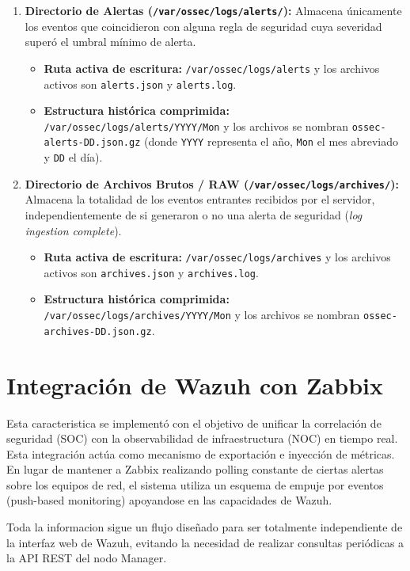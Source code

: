 \begin{enumerate}[leftmargin=*]
    \item \textbf{Directorio de Alertas (\texttt{/var/ossec/logs/alerts/}):}
    Almacena únicamente los eventos que coincidieron con alguna regla de seguridad cuya severidad superó el umbral mínimo de alerta.
    \begin{itemize}
        \item \textbf{Ruta activa de escritura:} \texttt{/var/ossec/logs/alerts} y los archivos activos son \texttt{alerts.json} y \texttt{alerts.log}.
        \item \textbf{Estructura histórica comprimida:} \texttt{/var/ossec/logs/alerts/YYYY/Mon} y los archivos se nombran \texttt{ossec-alerts-DD.json.gz} (donde \texttt{YYYY} representa el año, \texttt{Mon} el mes abreviado y \texttt{DD} el día).
    \end{itemize}

    \item \textbf{Directorio de Archivos Brutos / RAW (\texttt{/var/ossec/logs/archives/}):}
    Almacena la totalidad de los eventos entrantes recibidos por el servidor, independientemente de si generaron o no una alerta de seguridad (\textit{log ingestion complete}).
    \begin{itemize}
        \item \textbf{Ruta activa de escritura:} \texttt{/var/ossec/logs/archives} y los archivos activos son \texttt{archives.json} y \texttt{archives.log}.
        \item \textbf{Estructura histórica comprimida:} \texttt{/var/ossec/logs/archives/YYYY/Mon} y los archivos se nombran \texttt{ossec-archives-DD.json.gz}.
    \end{itemize}
\end{enumerate}

\section{Integración de Wazuh con Zabbix}
Esta caracteristica se implementó con el objetivo de unificar la correlación de seguridad (SOC) con la observabilidad de infraestructura (NOC) en tiempo real. Esta integración actúa como mecanismo de exportación e inyección de métricas. En lugar de mantener a Zabbix realizando polling constante de ciertas alertas sobre los equipos de red, el sistema utiliza un esquema de empuje por eventos (push-based monitoring) apoyandose en las capacidades de Wazuh.

Toda la informacion sigue un flujo diseñado para ser totalmente independiente de la interfaz web de Wazuh, evitando la necesidad de realizar consultas periódicas a la API REST del nodo Manager.

